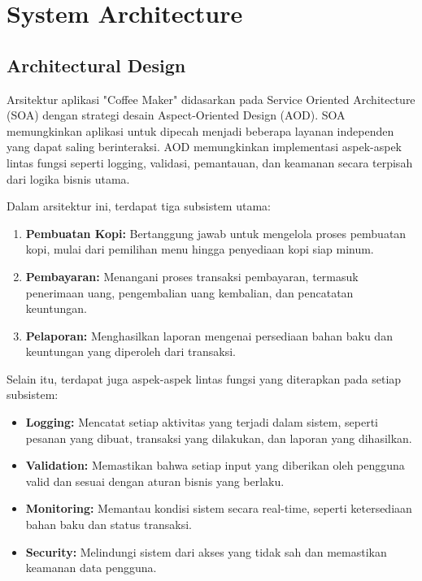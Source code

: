 \documentclass[12pt]{article}
\begin{document}
\section{System Architecture}
\subsection{Architectural Design}
Arsitektur aplikasi "Coffee Maker" didasarkan pada Service Oriented Architecture (SOA) dengan strategi desain Aspect-Oriented Design (AOD). SOA memungkinkan aplikasi untuk dipecah menjadi beberapa layanan independen yang dapat saling berinteraksi. AOD memungkinkan implementasi aspek-aspek lintas fungsi seperti logging, validasi, pemantauan, dan keamanan secara terpisah dari logika bisnis utama.

Dalam arsitektur ini, terdapat tiga subsistem utama:

\begin{enumerate}
\item \textbf{Pembuatan Kopi:} Bertanggung jawab untuk mengelola proses pembuatan kopi, mulai dari pemilihan menu hingga penyediaan kopi siap minum.
\item \textbf{Pembayaran:} Menangani proses transaksi pembayaran, termasuk penerimaan uang, pengembalian uang kembalian, dan pencatatan keuntungan.
\item \textbf{Pelaporan:} Menghasilkan laporan mengenai persediaan bahan baku dan keuntungan yang diperoleh dari transaksi.
\end{enumerate}

Selain itu, terdapat juga aspek-aspek lintas fungsi yang diterapkan pada setiap subsistem:

\begin{itemize}
\item \textbf{Logging:} Mencatat setiap aktivitas yang terjadi dalam sistem, seperti pesanan yang dibuat, transaksi yang dilakukan, dan laporan yang dihasilkan.
\item \textbf{Validation:} Memastikan bahwa setiap input yang diberikan oleh pengguna valid dan sesuai dengan aturan bisnis yang berlaku.
\item \textbf{Monitoring:} Memantau kondisi sistem secara real-time, seperti ketersediaan bahan baku dan status transaksi.
\item \textbf{Security:} Melindungi sistem dari akses yang tidak sah dan memastikan keamanan data pengguna.
\end{itemize}
\end{document}
